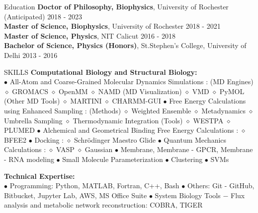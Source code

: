 \documentclass{resume} %
\begin{document}

\begin{rSection}{Education}
    {\bf Doctor of Philosophy, Biophysics}, University of Rochester (Anticipated) \hfill {2018 - 2023}\\
    {\bf Master of Science, Biophysics}, University of Rochester \hfill {2018 - 2021}\\
    {\bf Master of Science, Physics}, NIT Calicut \hfill {2016 - 2018}\\
    {\bf Bachelor of Science, Physics (Honors)}, St.Stephen's College, University of Delhi \hfill {2013 - 2016}


\end{rSection}


\begin{rSection}{SKILLS}
        {\bf Computational Biology and Structural Biology:} \\
        $\bullet$ All-Atom and Coarse-Grained Molecular Dynamics Simulations : 
        (MD Engines)   \textsf{$\diamond$ GROMACS $\diamond$ OpenMM $\diamond$ NAMD}
        (MD Visualization)  \textsf{$\diamond$ VMD $\diamond$ PyMOL}
        (Other MD Tools) \textsf{$\diamond$ MARTINI $\diamond$ CHARMM-GUI}
        $\bullet$ Free Energy Calculations using Enhanced Sampling :
        (Methods) $\diamond$ Weighted Ensemble $\diamond$ Metadynamics $\diamond$ Umbrella Sampling $\diamond$ Thermodynamic Integration
        (Tools) \textsf{$\diamond$ WESTPA $\diamond$ PLUMED}
        $\bullet$ Alchemical and Geometrical Binding Free Energy Calculations :
        $\diamond$ \textsf{BFEE2}
        $\bullet$ Docking : 
        $\diamond$ \textsf{Schrödinger Maestro Glide}
        $\bullet$ Quantum Mechanics Calculations : 
        \textsf{$\diamond$ VASP $\diamond$ Gaussian}
        $\bullet$ Membrane, Membrane - GPCR, Membrane - RNA modeling $\bullet$ Small Molecule Parameterization  $\bullet$ Clustering $\bullet$ SVMs

        {\bf Technical Expertise:} \\
        $\bullet$ Programming: \textsf{Python, MATLAB, Fortran, C++, Bash} $\bullet$
        Others: \textsf{Git - GitHub, Bitbucket, Jupyter Lab, AWS, MS Office Suite} $\bullet$
        System Biology Tools $-$  Flux analysis and metabolic network reconstruction: \textsf{COBRA, TIGER}

\end{rSection}
\end{document}
